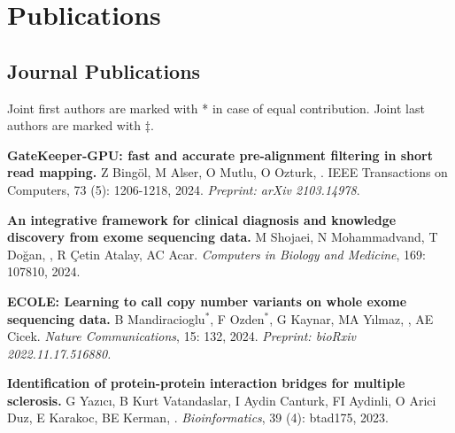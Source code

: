 \section{\sc Publications}
                                       
                                       \vspace{-0.5cm}
                                       
                                       \subsection{\small \sc Journal Publications}
                                       \vspace{-0.6cm}
                                       
                                       \small{
                                         Joint first authors are marked with * in case of equal contribution. Joint last authors are marked with $\ddag$.
                                       }


\vspace{-.2cm}
{\bf GateKeeper-GPU: fast and accurate pre-alignment filtering in short read mapping.}
Z Bingöl, M Alser, O Mutlu, O Ozturk, \calkan{}.
{IEEE Transactions on Computers}, 73 (5): 1206-1218, 2024.
{\it Preprint: arXiv 2103.14978}.


\vspace{-.2cm}
{\bf An integrative framework for clinical diagnosis and knowledge discovery from exome sequencing data.} M Shojaei, N Mohammadvand, T Doğan, \calkan{}, R Çetin Atalay, AC Acar.
{\it Computers in Biology and Medicine}, 169: 107810, 2024.

\vspace{-.2cm}

{\bf ECOLE: Learning to call copy number variants on whole exome sequencing data.} B Mandiracioglu$^\ast$,
F Ozden$^\ast$, G Kaynar, MA Yılmaz, \calkan{}, AE Cicek.
{\it Nature Communications}, 15: 132, 2024. \textit{Preprint: bioRxiv 2022.11.17.516880.}


\vspace{-.2cm}
{\bf Identification of protein-protein interaction bridges for multiple sclerosis.} G Yazıcı, B Kurt Vatandaslar, I Aydin Canturk, FI Aydinli, O Arici Duz, E Karakoc, BE Kerman, \calkan{}. {\it Bioinformatics}, 39 (4): btad175, 2023.

